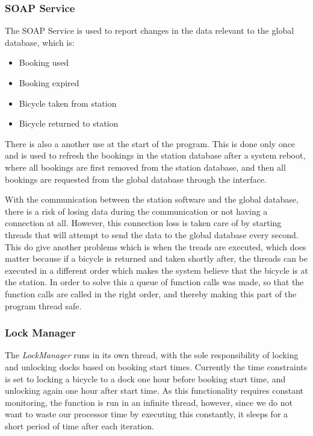 \subsubsection{SOAP Service}
The SOAP Service is used to report changes in the data relevant to the global database, which is:

\begin{itemize}
\item Booking used
\item Booking expired
\item Bicycle taken from station
\item Bicycle returned to station
\end{itemize}

There is also a another use at the start of the program.
This is done only once and is used to refresh the bookings in the station database after a system reboot, where all bookings are first removed from the station database, and then all bookings are requested from the global database through the interface.

With the communication between the station software and the global database, there is a risk of losing data during the communication or not having a connection at all.
However, this connection loss is taken care of by starting threads that will attempt to send the data to the global database every second.
This do give another problems which is when the treads are executed, which does matter because if a bicycle is returned and taken shortly after, the threads can be executed in a different order which makes the system believe that the bicycle is at the station. 
In order to solve this a queue of function calls was made, so that the function calls are called in the right order, and thereby making this part of the program thread safe.

\subsubsection{Lock Manager}
The \textit{LockManager} runs in its own thread, with the sole responsibility of locking and unlocking docks based on booking start times. 
Currently the time constraints is set to locking a bicycle to a dock one hour before booking start time, and unlocking again one hour after start time. 
As this functionality requires constant monitoring, the function is run in an infinite thread, however, since we do not want to waste our processor time by executing this constantly, it sleeps for a short period of time after each iteration.

